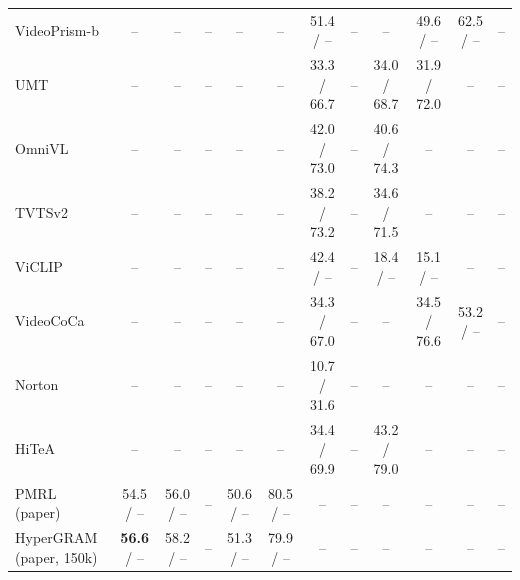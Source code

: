 \begin{table}[t]
\begin{tabular}{lccccccccccc}
VideoPrism-b & -- & -- & -- & -- & -- & 51.4 / -- & -- & -- & 49.6 / -- & 62.5 / -- & -- \\
UMT & -- & -- & -- & -- & -- & 33.3 / 66.7 & -- & 34.0 / 68.7 & 31.9 / 72.0 & -- & -- \\
OmniVL & -- & -- & -- & -- & -- & 42.0 / 73.0 & -- & 40.6 / 74.3 & -- & -- & -- \\
TVTSv2 & -- & -- & -- & -- & -- & 38.2 / 73.2 & -- & 34.6 / 71.5 & -- & -- & -- \\
ViCLIP & -- & -- & -- & -- & -- & 42.4 / -- & -- & 18.4 / -- & 15.1 / -- & -- & -- \\
VideoCoCa & -- & -- & -- & -- & -- & 34.3 / 67.0 & -- & -- & 34.5 / 76.6 & 53.2 / -- & -- \\
Norton & -- & -- & -- & -- & -- & 10.7 / 31.6 & -- & -- & -- & -- & -- \\
HiTeA & -- & -- & -- & -- & -- & 34.4 / 69.9 & -- & 43.2 / 79.0 & -- & -- & -- \\
PMRL (paper) & 54.5 / -- & 56.0 / -- & -- & 50.6 / -- & 80.5 / -- & -- & -- & -- & -- & -- & -- \\
HyperGRAM (paper, 150k) & \textbf{56.6} / -- & 58.2 / -- & -- & 51.3 / -- & 79.9 / -- & -- & -- & -- & -- & -- & -- \\
\bottomrule
\end{tabular}
\end{table}
